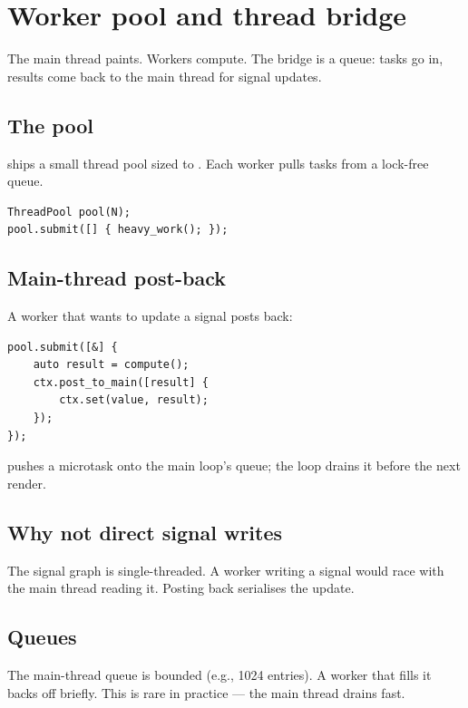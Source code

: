 \chapter{Worker pool and thread bridge}
\label{ch:workers}

\begin{aside}
The main thread paints. Workers compute. The bridge is a
queue: tasks go in, results come back to the main thread for
signal updates.
\end{aside}

\section{The pool}

\maya{} ships a small thread pool sized to
. Each worker
pulls tasks from a lock-free queue.

\begin{lstlisting}
ThreadPool pool(N);
pool.submit([] { heavy_work(); });
\end{lstlisting}

\section{Main-thread post-back}

A worker that wants to update a signal posts back:

\begin{lstlisting}
pool.submit([&] {
    auto result = compute();
    ctx.post_to_main([result] {
        ctx.set(value, result);
    });
});
\end{lstlisting}

 pushes a microtask onto the main
loop's queue; the loop drains it before the next render.

\section{Why not direct signal writes}

The signal graph is single-threaded. A worker writing a
signal would race with the main thread reading it. Posting
back serialises the update.

\section{Queues}

The main-thread queue is bounded (e.g., 1024 entries). A
worker that fills it backs off briefly. This is rare in
practice --- the main thread drains fast.

